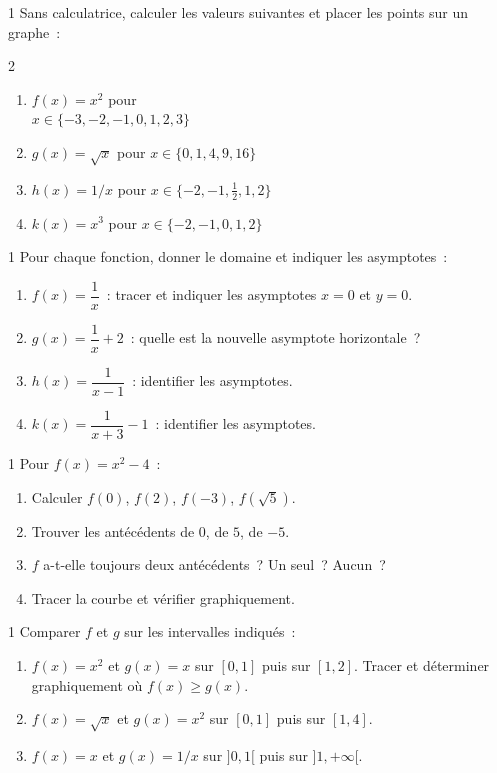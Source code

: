\begin{exo}{1}
Sans calculatrice, calculer les valeurs suivantes et placer les points
sur un graphe~:
\begin{multicols}{2}
\begin{enumerate}
  \item $f(x)=x^2$ pour\\ $x\in\{-3,-2,-1,0,1,2,3\}$
  \item $g(x)=\sqrt{x}$ pour $x\in\{0,1,4,9,16\}$
  \item $h(x)=1/x$ pour $x\in\{-2,-1,\frac{1}{2},1,2\}$
  \item $k(x)=x^3$ pour $x\in\{-2,-1,0,1,2\}$
\end{enumerate}
\end{multicols}
\end{exo}

\begin{exo}{1}
Pour chaque fonction, donner le domaine et indiquer les asymptotes~:
\begin{enumerate}
  \item $f(x) = \dfrac{1}{x}$~: tracer et indiquer les asymptotes $x=0$ et $y=0$.
  \item $g(x) = \dfrac{1}{x} + 2$~: quelle est la nouvelle asymptote horizontale~?
  \item $h(x) = \dfrac{1}{x-1}$~: identifier les asymptotes.
  \item $k(x) = \dfrac{1}{x+3} - 1$~: identifier les asymptotes.
\end{enumerate}
\end{exo}

\begin{exo}{1}
Pour $f(x) = x^2 - 4$~:
\begin{enumerate}
  \item Calculer $f(0)$, $f(2)$, $f(-3)$, $f(\sqrt{5})$.
  \item Trouver les ant\'ec\'edents de $0$, de $5$, de $-5$.
  \item $f$ a-t-elle toujours deux ant\'ec\'edents~? Un seul~? Aucun~?
  \item Tracer la courbe et v\'erifier graphiquement.
\end{enumerate}
\end{exo}

\begin{exo}{1}
Comparer $f$ et $g$ sur les intervalles indiqu\'es~:
\begin{enumerate}
  \item $f(x)=x^2$ et $g(x)=x$ sur $[0,1]$ puis sur $[1,2]$.
        Tracer et d\'eterminer graphiquement o\`u $f(x)\geq g(x)$.
  \item $f(x)=\sqrt{x}$ et $g(x)=x^2$ sur $[0,1]$ puis sur $[1,4]$.
  \item $f(x)=x$ et $g(x)=1/x$ sur $]0,1[$ puis sur $]1,+\infty[$.
\end{enumerate}
\end{exo}

